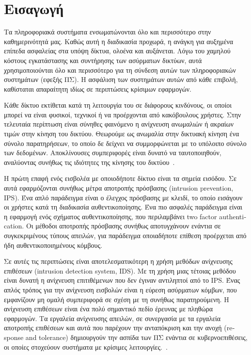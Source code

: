 \documentclass[12pt]{report}
\begin{document}
\hypersetup{pageanchor=true}
\clearpage
{}

\chapter{Εισαγωγή}
\hypersetup{pageanchor=true}
Τα πληροφοριακά συστήματα ενσωματώνονται όλο και περισσότερο στην καθημερινότητά μας. Καθώς αυτή η διαδικασία προχωρά, η ανάγκη για αυξημένα επίπεδα ασφαλείας στα υπόψη δίκτυα, ολοένα και αυξάνεται. Λόγω του χαμηλού κόστους εγκατάστασης και συντήρησης των ασύρματων δικτύων, αυτά χρησιμοποιούνται όλο και περισσότερο για τη σύνδεση αυτών των πληροφοριακών συστημάτων (εφεξής ΠΣ). Η ασφάλιση των συστημάτων αυτών από κάθε επιβολή, καθίσταται απαραίτητη ιδίως σε περιπτώσεις κρίσιμων εφαρμογών.

Κάθε δίκτυο εκτίθεται κατά τη λειτουργία του σε διάφορους κινδύνους, οι οποίοι μπορεί να είναι φυσικοί, τεχνικοί ή να προέρχονται από κακόβουλους χρήστες. Στην τελευταία περίπτωση είναι σύνηθες φαινόμενο η ανίχνευση ανωμαλιών ή ακραίων τιμών στην κίνηση του δικτύου. Θεωρούμε ως ανωμαλία στην δικτυακή κίνηση ένα σύνολο παρατηρήσεων, το οποίο δε δείχνει να συμμορφώνεται με το υπόλοιπο σύνολο των δεδομένων. Αποκλίνουσες συμπεριφορές είναι δυνατό να ταυτοποιηθούν, αναλύοντας συνήθως τις ιδιότητες της κίνησης του δικτύου~\cite{paper:05}.

Η πρώτη επαφή ενός εισβολέα με οποιοδήποτε δίκτυο είναι τα σημεία εισόδου. Σε αυτά εφαρμόζονται συνήθως μέτρα αποτροπής πρόσβασης (\textlatin{intrusion prevention, IPS}). Ένα απλό παράδειγμα είναι ο έλεγχος πρόσβασης με κλειδί, το οποίο εισάγουν οι χρήστες κατά τη διαδικασία αυθεντικοποίησης. Ένα πιο ασφαλές παράδειγμα είναι η εφαρμογή ενός σχήματος αυθεντικοποίησης, που περιλαμβάνει \textlatin{two factor authentication}. Οι μέθοδοι αποτροπής πρόσβασης συνήθως αποτυγχάνουν ενάντια σε συγκεκριμένους τύπους απειλών, για παράδειγμα οποιαδήποτε επίθεση προέρχεται από ήδη αυθεντικοποιημένους κόμβους.

Σε αυτές τις περιπτώσεις είναι αποτελεσματικότερη η χρήση μεθόδων ανίχνευσης επιθέσεων (\textlatin{intrusion detection system, IDS}). Με τη χρήση μιας τέτοιας μεθόδου είναι δυνατή η ανίχνευση επιτιθέμενων που δεν έγιναν αντιληπτοί από το \textlatin{IPS}. Ένας απλός τρόπος για την ανίχνευση εισβολών είναι η εύρεση ασύρματων κόμβων, που εμφανίζουν μη ομαλή συμπεριφορά σε σχέση με τη συνήθως παρατηρούμενη. Η ανίχνευση επιθέσεων είναι ένα πολύ σημαντικό πεδίο έρευνας με πληθώρα εφαρμογών. Τα εργαλεία ανίχνευσης απειλών, σε συνεργασία με τα εργαλεία αποτροπής επιθέσεων και αυτά που παρέχουν την ανταπόκριση και την ανοχή (\textlatin{response and tolerance}) δημιουργούν την ασπίδα των ΠΣ ενάντια σε κυβερνοεπιθέσεις, οι οποίες στοχεύουν συστήματα με κρίσιμες λειτουργίες.~\cite{paper:13}.
\end{document}
